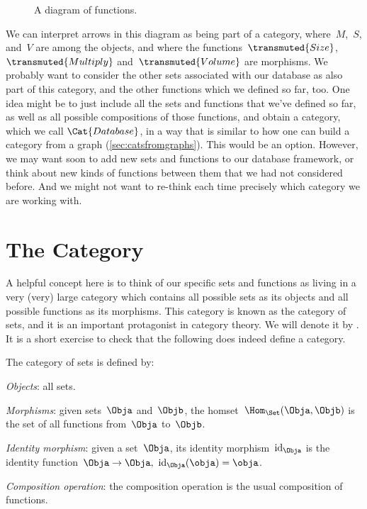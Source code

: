 

\begin{figure}[h!]
    \begin{center}
    \end{center}
    \caption{A diagram of functions. \label{fig:diagram_functions}}
\end{figure}

We can interpret arrows in this diagram as being part of a category, where~$M$,~$S$, and~$V$ are among the objects, and where the functions~$\transmuted{Size}$, $\transmuted{Multiply}$ and~$\transmuted{Volume}$ are morphisms. We probably want to consider the other sets associated with our database as also part of this category, and the other functions which we defined so far, too. One idea might be to just include all the sets and functions that we've defined so far, as well as all possible compositions of those functions, and obtain a category, which we call $\Cat{Database}$, in a way that is similar to how one can build a category from a graph (\cref{sec:catsfromgraphs}). This would be an option. However, we may want soon to add new sets and functions to our database framework, or think about new kinds of functions between them that we had not considered before. And we might not want to re-think each time precisely which category we are working with.


\section{The Category \Set}

A helpful concept here is to think of our specific sets and functions as living in a very (very) large category which contains all possible sets as its objects and all possible functions as its morphisms. This category is known as the category of sets, and it is an important protagonist in category theory. We will denote it by \Set. It is a short exercise to check that the following does indeed define a category.

\begin{ctdefinition}
    The category of sets \iindex{\Set} is defined by:
    \begin{compactenum}
        \item \emph{Objects}: all sets.
        \item \emph{Morphisms}: given sets~$\Obja$ and~$\Objb$, the homset~$\Hom_\Set(\Obja,\Objb)$ is the set of all functions from~$\Obja$ to~$\Objb$.
        \item \emph{Identity morphism}: given a set~$\Obja$, its identity morphism~$\text{id}_\Obja$ is the identity function~$\Obja \to \Obja, \ \text{id}_\Obja(\obja) = \obja$.
        \item \emph{Composition operation}: the composition operation is the usual composition of functions.
    \end{compactenum}
\end{ctdefinition}

